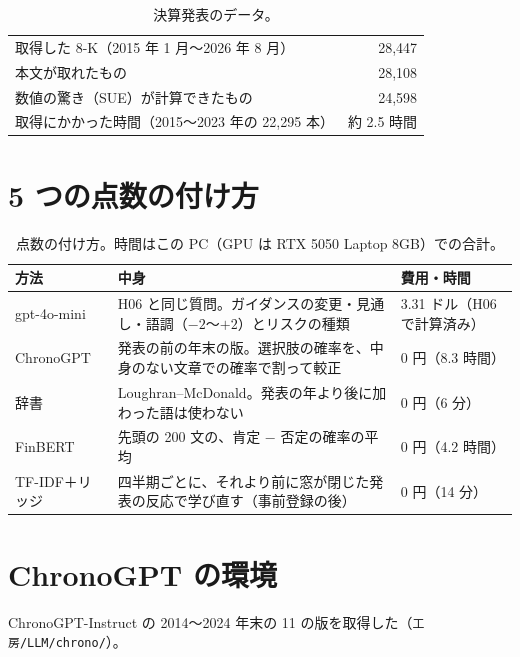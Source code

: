 \documentclass[xelatex,ja=standard,jafont=haranoaji,a4paper,10pt]{bxjsreport}
\newcommand{\code}[1]{\texttt{#1}}
\begin{document}
\begin{table}[H]
\centering
\caption{決算発表のデータ。}
\small
\begin{tabular}{lr}
\toprule
取得した 8-K（2015 年 1 月〜2026 年 8 月） & 28,447 \\
本文が取れたもの & 28,108 \\
数値の驚き（SUE）が計算できたもの & 24,598 \\
取得にかかった時間（2015〜2023 年の 22,295 本） & 約 2.5 時間 \\
\bottomrule
\end{tabular}
\end{table}

\section{5 つの点数の付け方}

\begin{table}[H]
\centering
\caption{点数の付け方。時間はこの PC（GPU は RTX 5050 Laptop 8GB）での合計。}
\small
\begin{tabular}{p{2.4cm}p{7.2cm}p{3.6cm}}
\toprule
方法 & 中身 & 費用・時間 \\
\midrule
gpt-4o-mini & H06 と同じ質問。ガイダンスの変更・見通し・語調（$-2$〜$+2$）とリスクの種類 & 3.31 ドル（H06 で計算済み） \\
ChronoGPT & 発表の前の年末の版。選択肢の確率を、中身のない文章での確率で割って較正 & 0 円（8.3 時間） \\
辞書 & Loughran--McDonald。発表の年より後に加わった語は使わない & 0 円（6 分） \\
FinBERT & 先頭の 200 文の、肯定 $-$ 否定の確率の平均 & 0 円（4.2 時間） \\
TF-IDF＋リッジ & 四半期ごとに、それより前に窓が閉じた発表の反応で学び直す（事前登録の後） & 0 円（14 分） \\
\bottomrule
\end{tabular}
\end{table}

\section{ChronoGPT の環境}

ChronoGPT-Instruct の 2014〜2024 年末の 11 の版を取得した（\code{工房/LLM/chrono/}）。
\end{document}
